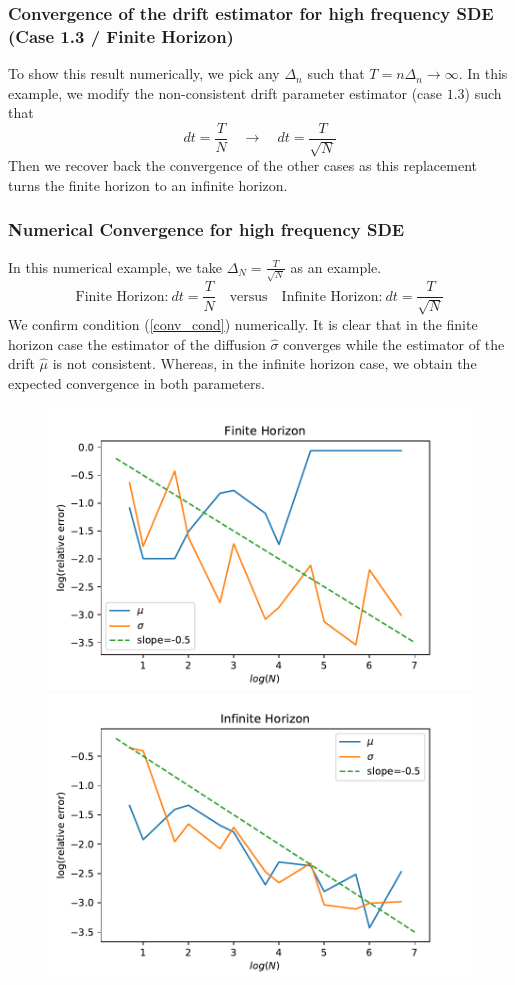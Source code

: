 \documentclass[aspectratio=169]{beamer}\usepackage[utf8]{inputenc}
\begin{document}
\begin{frame}\frametitle{Convergence of the drift estimator for high frequency  SDE  \\(Case 1.3 / Finite Horizon)}
To show this result numerically, we pick any $\Delta_n$ such that $T=n \Delta_n \to \infty$. In this example, we modify the non-consistent  drift parameter estimator (case $1.3$) such that 
\begin{equation}
dt=\frac{T}{N} \quad  \rightarrow  \quad dt=\frac{T}{\sqrt{N}}
\end{equation}
Then we recover back the convergence of the other cases as this replacement turns the finite horizon to an infinite horizon. 
\end{frame}


\begin{frame}\frametitle{Numerical Convergence for high frequency  SDE}
In this numerical example, we take $\Delta_N = \frac{T}{\sqrt{N}}$ as an example.
\begin{equation}
\text{Finite Horizon:} \ dt=\frac{T}{N} \quad  \text{versus} \quad \text{Infinite Horizon:} \ dt=\frac{T}{\sqrt{N}}
\end{equation}
We confirm  condition (\ref{conv_cond}) numerically. It is clear that in the finite horizon case the estimator of the diffusion $\hat{\sigma}$ converges while the estimator of the drift $\hat{\mu}$ is not consistent. Whereas, in the infinite horizon case, we obtain the expected convergence in both parameters.
\begin{figure}
  \includegraphics[scale=0.35]{Figures/case13v2.pdf}
   \includegraphics[scale=0.35]{Figures/case13infinite.pdf}

\end{figure}
\end{frame}
\end{document}
